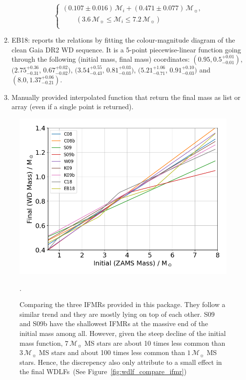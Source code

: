 \documentclass[fleqn,usenatbib]{rasti}
\newcommand{\msun}{\mathcal{M}_{\sun}}
\begin{document}
\begin{enumerate}
\begin{equation}
\begin{cases}
                  (0.107 \pm 0.016)\,\mathcal{M}_i + (0.471 \pm 0.077)\,\msun,\\
                  \qquad(3.6\,\msun \leq \mathcal{M}_i \leq 7.2\,\msun)\\
              \end{cases}
    \end{equation}
    \item EB18: \citet{2018ApJ...860L..17E} reports the relations by fitting the colour-magnitude diagram of the clean Gaia DR2 WD sequence. It is a 5-point piecewise-linear function going through the following (initial mass, final mass) coordinates: $(0.95, 0.5^{+0.01}_{-0.01})$, $(2.75^{+0.36}_{-0.31}$, $0.67^{+0.02}_{-0.02})$, $(3.54^{+0.55}_{-0.43}$, $0.81^{+0.03}_{-0.03})$, $(5.21^{+1.06}_{-0.71}$, $0.91^{+0.10}_{-0.03})$ and $(8.0, 1.37^{+0.06}_{-0.21})$.
    \item Manually provided interpolated function that return the final mass as list or array (even if a single point is returned).
\end{enumerate}

\begin{figure}
    \centering
    \includegraphics[width=\columnwidth]{ifmrs.png}
    \caption{Comparing the three IFMRs provided in this package. They follow
    a similar trend and they are mostly lying on top of each other. S09 and S09b
    have the shallowest IFMRs at the massive end of the initial mass among all.
    However, given the steep decline of the initial mass function, $7\,\msun$
    MS stars are about 10 times less common than $3\,\msun$ MS stars and about
    100 times less common than $1\,\msun$ MS stars. Hence, the discrepency also
    only attribute to a small effect in the final WDLFs~(See
    Figure~\ref{fig:wdlf_compare_ifmr})}.
    \label{fig:ifmrs}
\end{figure}
\end{document}
